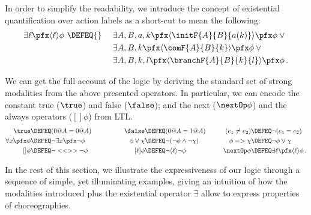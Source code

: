 \begin{notation}
  In order to simplify the readability, we introduce the concept of
  existential quantification over action labels as a short-cut to mean
  the following:
  \begin{alignat*}{2}
    \exists \ell \pfx \langle \ell \rangle \phi \ \DEFEQ {} \
    &&& \exists A,B,a,k \pfx
    \langle \initF{A}{B}{a(k)} \rangle \pfx \phi \lor {} \\
    &&& \exists A,B,k \pfx
    \langle \comF{A}{B}{k} \rangle \pfx \phi \lor {} \\
    &&& \exists A,B,k,l \pfx
    \langle \branchF{A}{B}{k}{l} \rangle \pfx \phi \, .
  \end{alignat*}
\end{notation}

\begin{remark}
  We can get the full account of the logic by deriving the standard
  set of strong modalities from the above presented operators. In
  particular, we can encode the constant true ($\true$) and false
  ($\false$); and the next ($\nextOp \phi$) and the always operators
  ($[] \phi$) from LTL.
  \begin{alignat*}{3}
    \true & \DEFEQ (0@A = 0@A) &\qquad\qquad
    \false  & \DEFEQ (0@A = 1@A) &\qquad
    (e_1 \neq e_2) & \DEFEQ \neg (e_1 = e_2) \\
    \forall x \pfx \phi & \DEFEQ \neg \exists x  \pfx \lnot \phi &
    \phi \lor \chi & \DEFEQ \lnot ( \lnot \phi  \land \lnot \chi) &
    \phi => \chi & \DEFEQ \lnot \phi \lor \chi \\
    [] \phi & \DEFEQ \lnot <<>> \neg \phi &
    [\ell] \phi & \DEFEQ \neg \langle \ell \rangle \neg \phi &
    \nextOp \phi & \DEFEQ \exists \ell \pfx \langle \ell \rangle \phi \, . %
  \end{alignat*}
\end{remark}

In the rest of this section, we illustrate the expressiveness of our
logic through a sequence of simple, yet illuminating examples, giving
an intuition of how the modalities introduced plus the existential
operator $\exists$ allow to express properties of choreographies.

